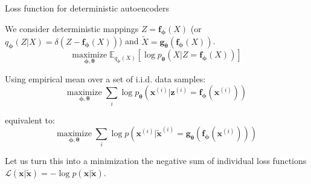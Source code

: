 \documentclass{beamer}
\begin{document}
  \begin{frame}{Loss function for deterministic autoencoders}

    We consider \alert{deterministic} mappings $Z = \mathbf{f}_{\boldsymbol{\phi}}(X)$ (or $q_{\boldsymbol{\phi}}(Z|X) = \delta(Z - \mathbf{f}_{\boldsymbol{\phi}}(X))$) and $\tilde{X} = \mathbf{g}_{\boldsymbol{\theta}}(\mathbf{f}_{\boldsymbol{\phi}}(X))$.
    \vspace{0cm}
    \begin{equation*}
      \underset{\boldsymbol{\phi},\boldsymbol{\theta}}{\text{maximize}} \; \mathbb{E}_{q_{\boldsymbol{\phi}}(X)}\left[\log p_{\boldsymbol{\theta}}(X|Z = \mathbf{f}_{\boldsymbol{\phi}}(X))\right]
    \end{equation*}

    Using empirical mean over a set of i.i.d. data samples:
    \vspace{0cm}
    \begin{equation*}
      \underset{\boldsymbol{\phi},\boldsymbol{\theta}}{\text{maximize}} \; \sum_i \log p_{\boldsymbol{\theta}}(\mathbf{x}^{(i)}|\mathbf{z}^{(i)} = \mathbf{f}_{\boldsymbol{\phi}}(\mathbf{x}^{(i)}))
    \end{equation*}

    equivalent to:
    \vspace{0cm}
    \begin{equation*}
      \underset{\boldsymbol{\phi},\boldsymbol{\theta}}{\text{maximize}} \; \sum_i \log p(\mathbf{x}^{(i)}|\tilde{\mathbf{x}}^{(i)} = \mathbf{g}_{\boldsymbol{\theta}}(\mathbf{f}_{\boldsymbol{\phi}}(\mathbf{x}^{(i)})))
    \end{equation*}

    Let us turn this into a minimization the negative sum of individual loss functions $\mathcal{L}(\mathbf{x}|\tilde{\mathbf{x}}) = -\log p(\mathbf{x}|\tilde{\mathbf{x}})$.
    
  \end{frame}
\end{document}

